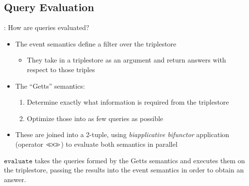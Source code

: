 \documentclass[logoontitle,tabu,supertabular,aspectratio=43]{preney-uwindsor-beamer}
\begin{document}
    \newcommand\biapply{\ensuremath{\mathbin{\ll\mkern-8mu*\mkern-8mu\gg}}}
    \subsection{Query Evaluation}
    \begin{frame}{\insertsection: \insertsubsection}
        How are queries evaluated?
        \begin{itemize}
            \item The event semantics define a filter over the triplestore
            \begin{itemize}
                \item They take in a triplestore as an argument and return answers with respect to those triples
            \end{itemize}
            \item The ``Getts'' semantics:
            \begin{enumerate}
                \item Determine exactly what information is required from the triplestore%
                \item Optimize those into as few queries as possible
            \end{enumerate}
            \item These are joined into a 2-tuple, using {\em biapplicative bifunctor} application (operator $\biapply$) to evaluate both semantics in parallel
        \end{itemize}
        \begin{block}{}
            $\mathtt{evaluate}$ takes the queries formed by the Getts semantics and executes them on the triplestore, passing the results into the event semantics in order to obtain an answer.
        \end{block}
    \end{frame}
\end{document}
